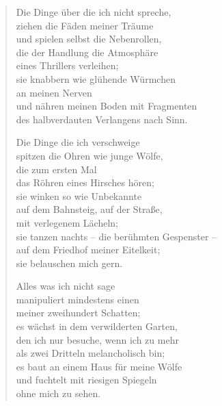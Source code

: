 
\cleartoverso


\begin{verse}

Die Dinge über die ich nicht spreche,\\
ziehen die Fäden meiner Träume\\
und spielen selbst die Nebenrollen,\\
die der Handlung die Atmosphäre\\
eines Thrillers verleihen;\\
sie knabbern wie glühende Würmchen\\
an meinen Nerven\\
und nähren meinen Boden mit Fragmenten\\
des halbverdauten Verlangens nach Sinn.

Die Dinge die ich verschweige\\
spitzen die Ohren wie junge Wölfe,\\
die zum ersten Mal\\
das Röhren eines Hirsches hören;\\
sie winken so wie Unbekannte\\
auf dem Bahnsteig, auf der Straße,\\
mit verlegenem Lächeln;\\
sie tanzen nachts -- die berühmten Gespenster --\\
auf dem Friedhof meiner Eitelkeit;\\
sie belauschen mich gern.

Alles was ich nicht sage\\
manipuliert mindestens einen\\
meiner zweihundert Schatten;\\
es wächst in dem verwilderten Garten,\\
den ich nur besuche, wenn ich zu mehr\\
als zwei Dritteln melancholisch bin;\\
es baut an einem Haus für meine Wölfe\\
und fuchtelt mit riesigen Spiegeln\\
ohne mich zu sehen.
\end{verse}

\clearpage


